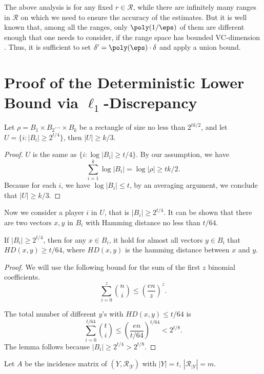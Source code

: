 The above analysis is for any fixed $r\in \mathcal{R}$, while there are infinitely many
ranges in $\mathcal{R}$ on which we need to ensure the accuracy of the estimates.  But it
is well known that, among all the ranges, only $\poly(1/\eps)$ of them are different
enough that one needs to consider, if the range space has bounded VC-dimension \cite{vc}.
Thus, it is sufficient to set $\delta'=\poly(\eps)\cdot \delta$ and apply a union bound.

\section{Proof of the Deterministic Lower Bound via $\ell_1$-Discrepancy} \label{app3}
\begin{lemma}\label{lemma:num}
Let $\rho=B_1\times B_2\cdots \times B_k$ be a rectangle of size no less than $2^{tk/2}$, and let $U=\{i: |B_i|\ge 2^{ t/4}\}$, then $|U|\ge  k/3$.
\end{lemma} 
\begin{proof}
$U$ is the same as $\{i:\log |B_i|\ge { t/4}\}$. By our assumption, we have
$$\sum_{i=1}^k \log |B_i| = \log |\rho| \ge  tk/2.$$
Because for each $i$, we have $\log |B_i|\le t$, by an averaging argument, we conclude that $|U|\ge  k/3$.
\end{proof}

Now we consider a player $i$ in $U$, that is $|B_i|\ge 2^{t/4}$. It can be shown that there
are two vectors $x, y$ in $B_i$ with Hamming distance no less than $t/64$. 

\begin{lemma}\label{lemma:hd}
  If $|B_i|\ge 2^{t/4}$, then for any $x\in B_i$, it hold for almost all vectors $y\in B_i$ that $HD(x, y)\ge t/64$, where $HD(x,y)$ is the hamming
    distance between $x$ and $y$.
\end{lemma} 
\begin{proof}
We will use the
following bound for the sum of the first $z$ binomial coefficients.
\begin{equation}
\sum_{i=0}^z {n\choose i} \le \left( \frac{en}{z} \right)^z. \label{eq:bino}
\end{equation}

The total number of different $y$'s with $HD(x,y)\le { t/64}$ is 
$$\sum_{i=0}^{{t/64}} {t\choose i} \le \left( \frac{en}{{ t/64}} \right)^{{ t/64}}< 2^{t/8}.$$ 
The lemma follows because $|B_i|\ge 2^{t/4}>2^{t/8}$.
\end{proof}

Let $A$ be the incidence matrix of $(Y,\mathcal{R}_{|Y})$ with $|Y|=t$,
$|\mathcal{R}_{|Y}|=m$.

